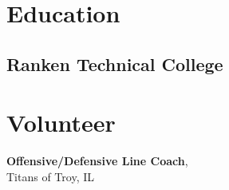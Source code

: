 \documentclass{TaylorTurnerResume2023}
\begin{document}
\begin{minipage}[t]{0.275\textwidth}
\section{Education} 
\subsection{Ranken Technical College}

\section{Volunteer} 
{\textbf{Offensive/Defensive Line Coach},\\
Titans of Troy, IL}






\end{minipage} 
\end{document}
